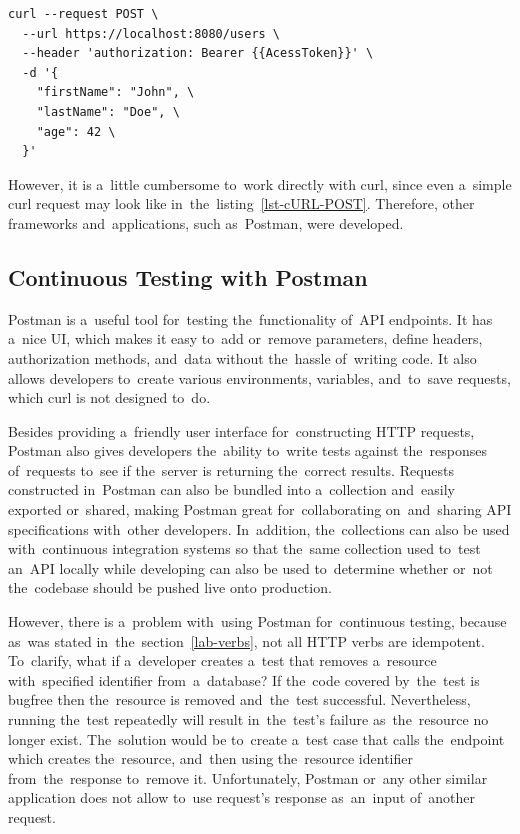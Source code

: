 \vspace{1mm}
\begin{lstlisting}[caption=An~example of~POST request that creates
\textit{user} resource on~the~server using API endpoint \textit{/users}.,
label=lst-cURL-POST, style=dp-no-strings, language=XML]
curl --request POST \
  --url https://localhost:8080/users \
  --header 'authorization: Bearer {{AcessToken}}' \
  -d '{
  	"firstName": "John", \ 
  	"lastName": "Doe", \
  	"age": 42 \
  }'
\end{lstlisting}

However, it is a~little cumbersome to~work directly with curl, since even
a~simple curl request may look like in~the~listing~\ref{lst-cURL-POST}.
Therefore, other frameworks and~applications, such as~Postman, were developed.



\subsection{Continuous Testing with Postman}
Postman is a~useful tool for~testing the~functionality of~API endpoints. It has
a~nice UI, which makes it easy to~add or~remove parameters, define headers,
authorization methods, and~data without the~hassle of~writing code. It also
allows developers to~create various environments, variables, and~to~save
requests, which curl is not designed to~do.

Besides providing a~friendly user interface for~constructing HTTP requests,
Postman also gives developers the~ability to~write tests against the~responses
of~requests to~see if the~server is returning the~correct results. Requests
constructed in~Postman can also be bundled into a~collection and~easily exported
or~shared, making Postman great for~collaborating on~and~sharing API
specifications with~other developers. In~addition, the~collections can also be
used with~continuous integration systems so that the~same collection used
to~test an~API locally while developing can also be used to~determine whether
or~not the~codebase should be pushed live onto production.

However, there is a~problem with~using Postman for~continuous testing,
because as~was stated in~the~section~\ref{lab-verbs}, not all HTTP verbs are
idempotent. To~clarify, what if a~developer creates a~test that removes
a~resource with~specified identifier from~a~database? If the~code covered
by~the~test is bugfree then the~resource is removed and~the~test successful.
Nevertheless, running the~test repeatedly will result in~the~test's failure
as~the~resource no longer exist. The~solution would be to~create a~test case
that calls the~endpoint which creates the~resource, and~then using the~resource
identifier from~the~response to~remove it. Unfortunately, Postman or~any other
similar application does not allow to~use request's response as~an~input
of~another request.



